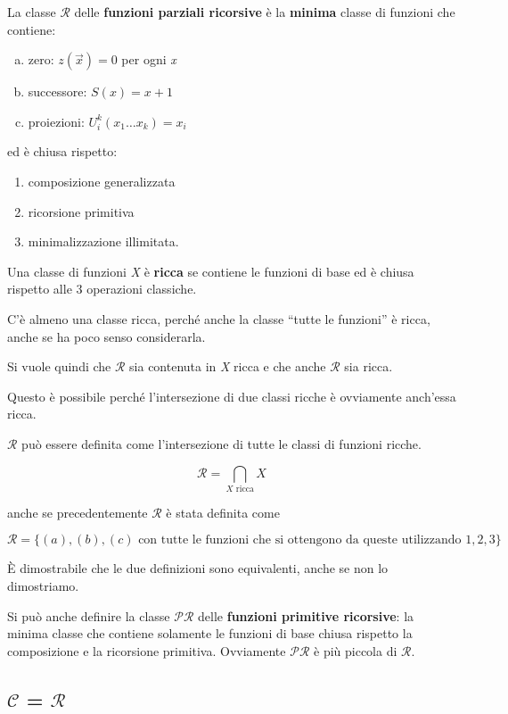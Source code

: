 La classe $ \mathcal{R} $ delle \textbf{funzioni parziali ricorsive} è la \textbf{minima} classe di funzioni che contiene:

\begin{enumerate}[(a)]
\item  zero: $ z(\vec{x}) = 0 $ per ogni \textit{x}
\item  successore: $ S(x) = x+1 $
\item  proiezioni: $ U_{i}^k (x_1 \ldots x_k) = x_i $
\end{enumerate}

ed è chiusa rispetto:

\begin{enumerate}
\item
  composizione generalizzata
\item
  ricorsione primitiva
\item
  minimalizzazione illimitata.
\end{enumerate}

Una classe di funzioni \emph{X} è \textbf{ricca} se contiene le funzioni
di base ed è chiusa rispetto alle 3 operazioni classiche.

C'è almeno una classe ricca, perché anche la classe ``tutte le
funzioni'' è ricca, anche se ha poco senso considerarla.

Si vuole quindi che $ \mathcal{R} $ sia contenuta in \emph{X} ricca e che anche
$ \mathcal{R} $ sia ricca.

Questo è possibile perché l'intersezione di due classi ricche è
ovviamente anch'essa ricca.

$ \mathcal{R} $ può essere definita come l'intersezione di tutte le classi di
funzioni ricche.

$$
\mathcal{R} = \bigcap_{X \text{ ricca}} X
$$

anche se precedentemente $ \mathcal{R} $ è stata definita come

$$
\mathcal{R} = \{ (a), (b), (c) \text{ con tutte le funzioni che si ottengono da queste utilizzando } 1,2,3 \}
$$

È dimostrabile che le due definizioni sono equivalenti, anche se non lo
dimostriamo.

Si può anche definire la classe $ \mathcal{PR} $ delle \textbf{funzioni
primitive ricorsive}: la minima classe che contiene solamente le funzioni
di base chiusa rispetto la composizione e la ricorsione primitiva.
Ovviamente $ \mathcal{PR} $ è più piccola di $ \mathcal{R} $.

\subsection{$ \mathcal{C} $ = $ \mathcal{R} $}\label{c-figa-r-figa}

